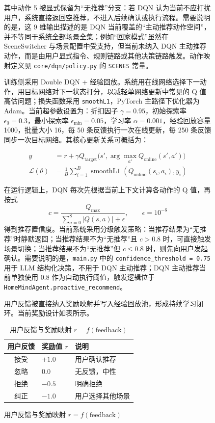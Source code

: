 \documentclass[12pt,a4paper,oneside]{ctexrep}
\begin{document}
\begin{figure}[H]
其中动作 5 被显式保留为“无推荐”分支：若 DQN 认为当前不应打扰用户，系统直接返回空推荐，不进入后续确认或执行流程。需要说明的是，这 9 维输出描述的是 DQN 当前覆盖的“主动推荐动作空间”，并不等同于系统全部场景全集；例如“回家模式”虽然在 SceneSwitcher 与场景配置中受支持，但当前未纳入 DQN 主动推荐动作，而是由用户显式指令、规则链路或其他决策链路触发。动作映射定义见 \texttt{core/dqn/policy.py} 的 \texttt{SCENES} 常量。

训练侧采用 Double DQN + 经验回放。系统用在线网络选择下一动作，用目标网络对下一状态打分，以减轻单网络更新中常见的 Q 值高估问题；损失函数采用 \texttt{smoothL1}，PyTorch 主路径下优化器为 Adam。当前超参数设置为：折扣因子 $\gamma = 0.95$，初始探索率 $\epsilon_0 = 0.3$，最小探索率 $\epsilon_{\min} = 0.05$，学习率 $\alpha = 0.001$，经验回放容量 1000，批量大小 16，每 50 条反馈执行一次在线更新，每 250 条反馈同步一次目标网络。其核心更新关系可概括为：

\[
\begin{aligned}
y &= r + \gamma Q_{\text{target}}\bigl(s', \arg\max_{a'} Q_{\text{online}}(s', a')\bigr) \\
\mathcal{L}(\theta) &= \frac{1}{B} \sum_{i=1}^{B} \operatorname{smoothL1}\!\left(Q_{\text{online}}(s_i, a_i), y_i\right)
\end{aligned}
\]

在运行逻辑上，DQN 每次先根据当前上下文计算各动作的 Q 值，再按式
\[
c = \frac{Q_{\max}}{\sum_{a=0}^{8} |Q(s, a)| + \epsilon}, \qquad \epsilon = 10^{-6}
\]
得到推荐置信度。当前系统采用分级触发策略：当推荐结果为“无推荐”时静默返回；当推荐结果不为“无推荐”且 $c > 0.8$ 时，可直接触发场景切换；当推荐结果不为“无推荐”但 $c \leq 0.8$ 时，则先向用户发起确认。需要说明的是，\texttt{main.py} 中的 \texttt{confidence\_threshold = 0.75} 用于 LLM 结构化决策，不用于 DQN 主动推荐；DQN 主动推荐当前单独使用 0.8 作为自动执行阈值，触发逻辑位于 \texttt{HomeMindAgent.proactive\_recommend}。

用户反馈被直接纳入奖励映射并写入经验回放池，形成持续学习闭环。当前奖励设计如表所示。

\begin{table}[H]
    \centering
    \caption{用户反馈与奖励映射 $r = f(\text{feedback})$}
    \begin{tabular}{@{}cll@{}}
        \toprule
        \textbf{用户反馈} & \textbf{奖励值 $r$} & \textbf{说明} \\
        \midrule
        接受 & $+1.0$ & 用户确认推荐 \\
        忽略 & $0.0$ & 无反馈，中性 \\
        拒绝 & $-0.5$ & 明确拒绝 \\
        纠正 & $-1.0$ & 用户选择其他场景 \\
        \bottomrule
    \end{tabular}
\end{table}


\end{figure}
\end{document}
